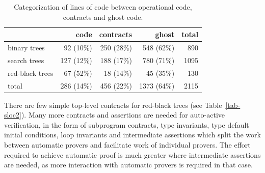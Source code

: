 \documentclass{llncs}
\begin{document}
\vspace{-0.5cm}
\begin{table}[h]
\begin{center}
\begin{tabular}{l|rrr|r}
                & code       & contracts  &      ghost  & total \\ \hline
binary trees    & 92  (10\%) & 250 (28\%) & 548  (62\%) & 890 \\
search trees    & 127 (12\%) & 188 (17\%) & 780  (71\%) & 1095 \\
red-black trees & 67  (52\%) & 18  (14\%) & 45   (35\%) & 130 \\ \hline
total           & 286 (14\%) & 456 (22\%) & 1373 (64\%) & 2115 \\
\end{tabular}
\vspace*{5mm}
\caption{\label{tab-sloc} Categorization of lines of code between operational code, contracts and ghost code.}
\vspace*{-10mm}
\end{center}
\end{table}


There are few simple top-level contracts for red-black trees
(see Table~\ref{tab-sloc2}).  Many more
contracts and assertions are needed for auto-active verification, in the form
of subprogram contracts, type invariants, type default initial conditions, loop
invariants and intermediate assertions which split the work between automatic
provers and facilitate work of individual provers. The effort required to
achieve automatic proof is much greater where intermediate assertions are
needed, as more interaction with automatic provers is required in that case.
\end{document}
